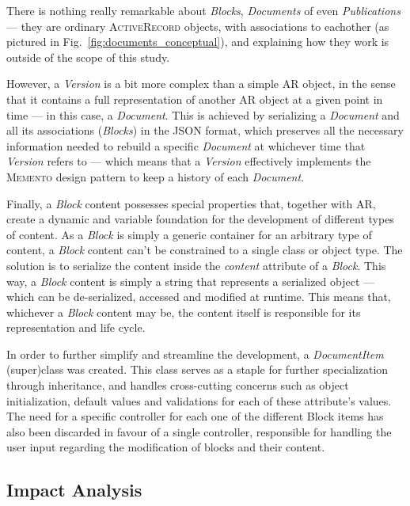 There is nothing really remarkable about \emph{Blocks}, \emph{Documents} of even \emph{Publications} --- they are ordinary \textsc{ActiveRecord} objects, with associations to eachother (as pictured in Fig.~\ref{fig:documents_conceptual}), and explaining how they work is outside of the scope of this study.

However, a \emph{Version} is a bit more complex than a simple AR object, in the sense that it contains a full representation of another AR object at a given point in time --- in this case, a \emph{Document}. This is achieved by serializing a \emph{Document} and all its associations (\emph{Blocks}) in the JSON format, which preserves all the necessary information needed to rebuild a specific \emph{Document} at whichever time that \emph{Version} refers to --- which means that a \emph{Version} effectively implements the \textsc{Memento} design pattern to keep a history of each \emph{Document}.

Finally, a \emph{Block} content possesses special properties that, together with AR, create a dynamic and variable foundation for the development of different types of content. As a \emph{Block} is simply a generic container for an arbitrary type of content, a \emph{Block} content can't be constrained to a single class or object type. The solution is to serialize the content inside the \emph{content} attribute of a \emph{Block}. This way, a \emph{Block} content is simply a string that represents a serialized object --- which can be de-serialized, accessed and modified at runtime. This means that, whichever a \emph{Block} content may be, the content itself is responsible for its representation and life cycle.

In order to further simplify and streamline the development, a \emph{DocumentItem} (super)class was created. This class serves as a staple for further specialization through inheritance, and handles cross-cutting concerns such as object initialization, default values and validations for each of these attribute's values. The need for a specific controller for each one of the different Block items has also been discarded in favour of a single controller, responsible for handling the user input regarding the modification of blocks and their content.

\subsection{Impact Analysis}\label{sec:fa_documents_impact_analysis}

